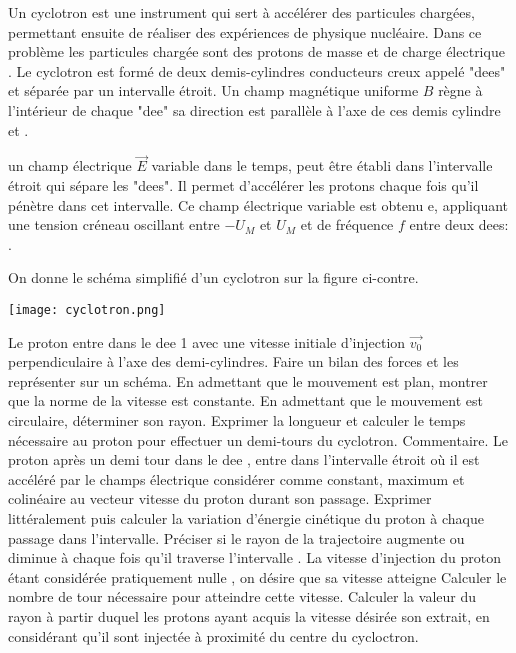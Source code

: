 \begin{Exercise}[title=(*) Étude d'un cyclotron]
  \begin{minipage}{.6\linewidth}
    Un cyclotron est une instrument qui sert à accélérer des particules chargées, permettant ensuite de réaliser des expériences de physique nucléaire. Dans ce problème les particules chargée sont des protons de masse  et de charge électrique .
    Le cyclotron est formé de deux demis-cylindres conducteurs creux appelé "dees" et séparée par un intervalle étroit. Un champ magnétique uniforme $B$ règne à l'intérieur de chaque "dee" sa direction est parallèle à l'axe de ces demis cylindre et .

    un champ électrique $\vec{E}$ variable dans le temps, peut être établi dans l'intervalle étroit qui sépare les "dees". Il permet d'accélérer les protons chaque fois qu'il pénètre dans cet intervalle. Ce champ électrique variable est obtenu e, appliquant une tension créneau oscillant entre $-U_M$ et $U_M$ et de fréquence $f$ entre deux dees: .

	On donne le schéma simplifié d'un cyclotron sur la figure ci-contre.
  \end{minipage}\hspace{.05\linewidth}
  \begin{minipage}{.3\linewidth}
    \texttt{[image: cyclotron.png]}
  \end{minipage}
  \Question Le proton entre dans le dee 1 avec une vitesse initiale d'injection $\vec{v_0}$ perpendiculaire à l'axe des demi-cylindres.
		\subQuestion Faire un bilan des forces et les représenter sur un schéma.
		\subQuestion En admettant que le mouvement est plan, montrer que la norme de la vitesse est constante.
		\subQuestion En admettant que le mouvement est circulaire, déterminer son rayon.
		\subQuestion Exprimer la longueur et calculer le temps nécessaire au proton pour effectuer un demi-tours du cyclotron. Commentaire.
		\Question Le proton après un demi tour dans le dee , entre dans l'intervalle étroit où il est accéléré par le champs électrique considérer comme constant, maximum et colinéaire au vecteur vitesse du proton durant son passage.
		\subQuestion Exprimer littéralement puis calculer la variation  d'énergie cinétique du proton à chaque passage dans l'intervalle.
		\subQuestion Préciser  si le rayon  de la trajectoire augmente ou diminue à chaque fois qu'il traverse l'intervalle .
		\Question La vitesse d'injection du proton étant considérée pratiquement nulle , on désire que sa vitesse 	atteigne 
		\subQuestion Calculer le nombre de tour nécessaire pour atteindre cette vitesse.
		\subQuestion Calculer la valeur du rayon à partir duquel les protons ayant acquis la vitesse désirée son extrait, en considérant qu'il sont injectée à proximité du centre du cycloctron.
\end{Exercise}
